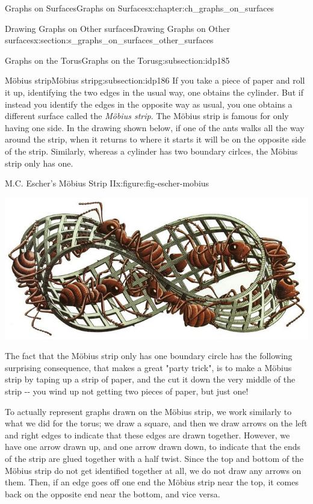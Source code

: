 \documentclass[oneside,10pt,]{book}
\numberwithin{equation}{section}
\begin{document}
\begin{chapterptx}{Graphs on Surfaces}{}{Graphs on Surfaces}{}{}{x:chapter:ch_graphs_on_surfaces}
\begin{sectionptx}{Drawing Graphs on Other surfaces}{}{Drawing Graphs on Other surfaces}{}{}{x:section:s_graphs_on_surfaces_other_surfaces}
\begin{subsectionptx}{Graphs on the Torus}{}{Graphs on the Torus}{}{}{g:subsection:idp185}
\end{subsectionptx}
%
%
\typeout{************************************************}
\typeout{************************************************}
%
\begin{subsectionptx}{Möbius strip}{}{Möbius strip}{}{}{g:subsection:idp186}
If you take a piece of paper and roll it up, identifying the two edges in the usual way, one obtains the cylinder.  But if instead you identify the edges in the opposite way as usual, you one obtains a different surface called the \emph{Möbius strip}.  The Möbius strip is famous for only having one side.  In the drawing shown below, if one of the ants walks all the way around the strip, when it returns to where it starts it will be on the opposite side of the strip.  Similarly, whereas a cylinder has two boundary cirlces, the Möbius strip only has one.%
\begin{figureptx}{M.C. Escher's Möbius Strip II}{x:figure:fig-escher-mobius}{}%
\begin{image}{0.05}{0.9}{0.05}%
\includegraphics[width=\linewidth]{images/EscherMobius.jpg}
\end{image}%
\tcblower
\end{figureptx}%
The fact that the Möbius strip only has one boundary circle has the following surprising consequence, that makes a great "party trick", is to make a Möbius strip by taping up a strip of paper, and the cut it down the very middle of the strip -{}-{} you wind up not getting two pieces of paper, but just one!%
\par
To actually represent graphs drawn on the Möbius strip, we work similarly to what we did for the torus; we draw a square, and then we draw arrows on the left and right edges to indicate that these edges are drawn together.  However, we have one arrow drawn up, and one arrow drawn down, to indicate that the ends of the strip are glued together with a half twist.   Since the top and bottom of the Möbius strip do not get identified together at all, we do not draw any arrows on them.  Then, if an edge goes off one end the Möbius strip near the top, it comes back on the opposite end near the bottom, and vice versa.%

\end{subsectionptx}
\end{sectionptx}
\end{chapterptx}
\end{document}
